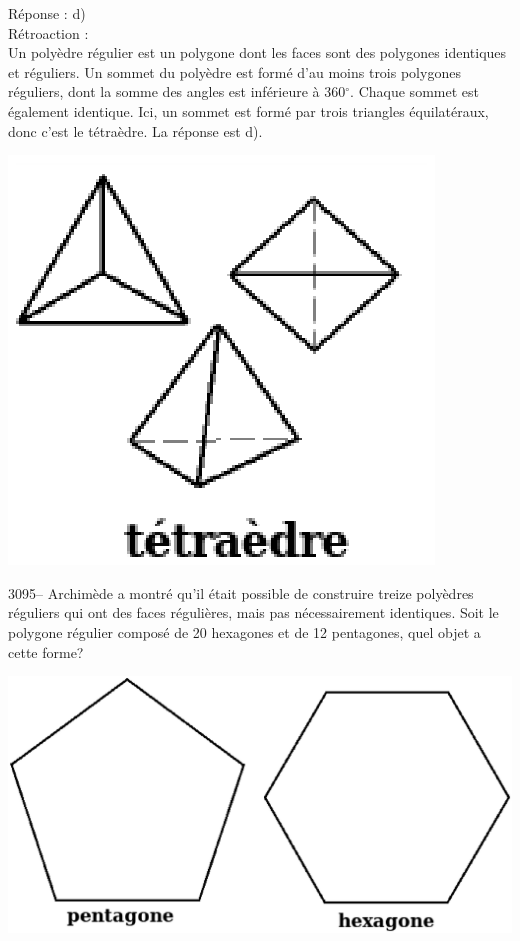 \documentclass[letterpaper, 12pt]{article}
\begin{document}
R\'eponse : d)\\

R\'etroaction :\\
Un poly\`edre r\'egulier est un polygone dont les faces sont des polygones identiques et r\'eguliers. Un sommet du poly\`edre est form\'e d'au moins trois polygones r\'eguliers, dont la somme des angles est inf\'erieure \`a 360$^\circ$. Chaque sommet est \'egalement identique. Ici, un sommet est form\'e par trois triangles \'equilat\'eraux, donc c'est le t\'etra\`edre. La r\'eponse est d).
\begin{center}
\includegraphics[scale=0.5]{polytetramultiple.eps}
\end{center}



3095-- Archim\`ede a montr\'e qu'il \'etait possible de construire treize poly\`edres r\'eguliers qui ont des faces r\'eguli\`eres, mais pas n\'ecessairement identiques. Soit le polygone r\'egulier compos\'e de 20 hexagones et de 12 pentagones, quel objet a cette forme?
\begin{center}
\includegraphics[scale=0.25]{polygones.eps}\\
\end{center}
\end{document}
